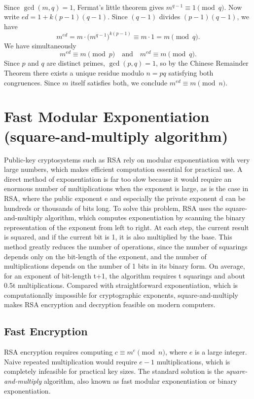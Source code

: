 \\ Since $\gcd(m,q)=1$, Fermat's little theorem gives
$m^{q-1} \equiv 1 \pmod{q}$. Now write $ed = 1 + k(p-1)(q-1)$. Since $(q-1)$ divides
$(p-1)(q-1)$, we have
\[
  m^{ed} = m \cdot \bigl(m^{q-1}\bigr)^{k(p-1)} \equiv m \cdot 1 = m \pmod{q}.
\]
We have simultaneously
\[
  m^{ed} \equiv m \pmod{p} \quad \text{and} \quad m^{ed} \equiv m \pmod{q}.
\]
Since $p$ and $q$ are distinct primes, $\gcd(p,q)=1$, so by the Chinese Remainder
Theorem there exists a unique residue modulo $n = pq$ satisfying both congruences. Since
$m$ itself satisfies both, we conclude $m^{ed} \equiv m \pmod{n}$.



\section{ Fast Modular Exponentiation (square-and-multiply algorithm)}
Public-key cryptosystems such as RSA rely on modular exponentiation with very large numbers, which makes efficient computation essential for practical use. A direct method of exponentiation is far too slow because it would require an enormous number of multiplications when the exponent is large, as is the case in RSA, where the public exponent e and especially the private exponent d can be hundreds or thousands of bits long. To solve this problem, RSA uses the square-and-multiply algorithm, which computes exponentiation by scanning the binary representation of the exponent from left to right. At each step, the current result is squared, and if the current bit is 1, it is also multiplied by the base. This method greatly reduces the number of operations, since the number of squarings depends only on the bit-length of the exponent, and the number of multiplications depends on the number of 1 bits in its binary form. On average, for an exponent of bit-length t+1, the algorithm requires t squarings and about 0.5t multiplications. Compared with straightforward exponentiation, which is computationally impossible for cryptographic exponents, square-and-multiply makes RSA encryption and decryption feasible on modern computers.



\subsection{Fast Encryption}
\label{subsec:fast-enc}


RSA encryption requires computing $c \equiv m^e \pmod{n}$, where $e$ is a
large integer. Naive repeated multiplication would require $e-1$
multiplications, which is completely infeasible for practical key sizes. The standard
solution is the \textit{square-and-multiply} algorithm, also known as fast modular
exponentiation or binary exponentiation.

